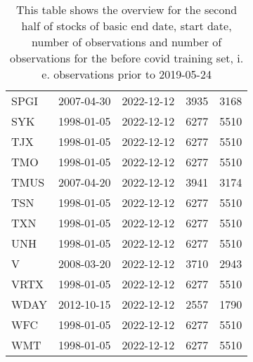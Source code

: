 \begin{table}[ht]
\begin{tabular}{lllrr}
  SPGI & 2007-04-30 & 2022-12-12 & 3935 & 3168 \\ 
  SYK & 1998-01-05 & 2022-12-12 & 6277 & 5510 \\ 
  TJX & 1998-01-05 & 2022-12-12 & 6277 & 5510 \\ 
  TMO & 1998-01-05 & 2022-12-12 & 6277 & 5510 \\ 
  TMUS & 2007-04-20 & 2022-12-12 & 3941 & 3174 \\ 
  TSN & 1998-01-05 & 2022-12-12 & 6277 & 5510 \\ 
  TXN & 1998-01-05 & 2022-12-12 & 6277 & 5510 \\ 
  UNH & 1998-01-05 & 2022-12-12 & 6277 & 5510 \\ 
  V & 2008-03-20 & 2022-12-12 & 3710 & 2943 \\ 
  VRTX & 1998-01-05 & 2022-12-12 & 6277 & 5510 \\ 
  WDAY & 2012-10-15 & 2022-12-12 & 2557 & 1790 \\ 
  WFC & 1998-01-05 & 2022-12-12 & 6277 & 5510 \\ 
  WMT & 1998-01-05 & 2022-12-12 & 6277 & 5510 \\ 
   \hline
\end{tabular}
\caption[Overview_2]{This table shows the overview for the second half of stocks of basic end date, start date, number of observations and number of observations 
                     for the before covid training set, i. e. observations prior to 2019-05-24} 
\label{Table:Overview_2}
\end{table}
